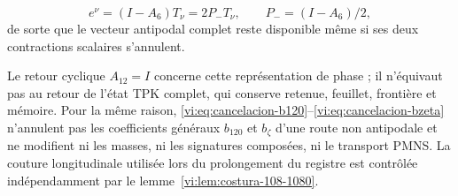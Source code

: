 \[
 e^\nu=(I-A_6)T_\nu=2P_-T_\nu,
 \qquad P_-=(I-A_6)/2,
\]
de sorte que le vecteur antipodal complet reste disponible même si ses
deux contractions scalaires s’annulent.


Le retour cyclique \(A_{12}=I\) concerne cette représentation de phase ;
il n’équivaut pas au retour de l’état TPK complet, qui conserve retenue, feuillet,
frontière et mémoire. Pour la même raison,
\eqref{vi:eq:cancelacion-b120}--\eqref{vi:eq:cancelacion-bzeta} n’annulent pas
les coefficients généraux \(b_{120}\) et \(b_\zeta\) d’une route non
antipodale et ne modifient ni les masses, ni les signatures composées, ni le transport
PMNS. La couture longitudinale utilisée lors du prolongement du registre est
contrôlée indépendamment par le
lemme~\ref{vi:lem:costura-108-1080}.

